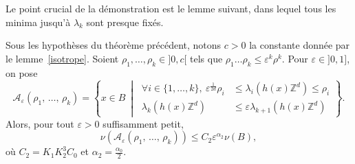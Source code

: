 \documentclass[AHL,Unicode,longabstracts,francais,published]{cedram}
\newcommand{\se}[2]{\{#1,\dots,#2\}}
\newcommand{\Z}{\mathbb{Z}}
\newcommand{\cA}{\mathcal{A}}
\newcommand{\eps}{\varepsilon}
\let\oldforall\forall
\renewcommand*{\forall}{\mathrel{\oldforall}}
\begin{document}
Le point crucial de la démonstration est le lemme suivant, dans lequel tous les minima jusqu'à $\lambda_k$ sont presque fixés.

\begin{lemm}\label{crucial}
Sous les hypothèses du théorème précédent, notons $c>0$ la constante donnée par le lemme~\ref{isotrope}. Soient $\rho_1,\dots,\rho_k\in]0,c[$ tels que $\rho_1\dots\rho_k\leq\eps^k\rho^k$. Pour $\eps\in]0,1]$, on pose
\[
\cA_\eps\left(\rho_1,\,\dots,\,\rho_k\right) = \left\{x\in B\ \middle|\
\begin{split}
\forall i\in\se{1}{k},\ \eps^{\frac{1}{2d}}\rho_i &\leq \lambda_i\left(h(x)\Z^d\right) \leq \rho_i\\
\lambda_k\left(h(x)\Z^d\right) &\leq\eps\lambda_{k+1}\left(h(x)\Z^d\right)
\end{split}
\right\}.
\]
Alors, pour tout $\eps>0$ suffisamment petit,
\[
\nu\left(\cA_\eps\left(\rho_1,\,\dots,\,\rho_k\right)\right)
\leq C_2\eps^{\alpha_2}\nu(B),
\]
où $C_2=K_1K_2^3C_0$ et $\alpha_2=\frac{\alpha_0}{2}$.
\end{lemm}
\end{document}
